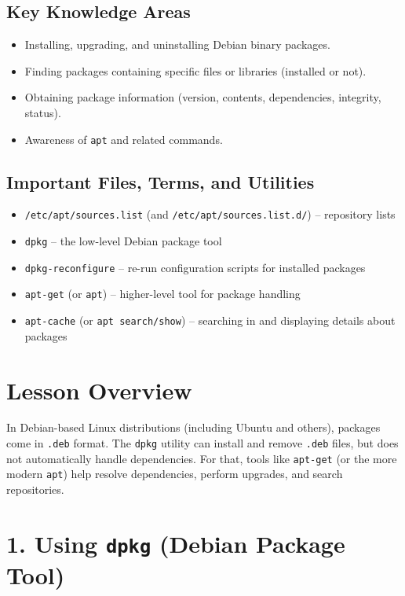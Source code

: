 \documentclass[12pt,a4paper]{report}
\begin{document}
\subsection*{Key Knowledge Areas}
\begin{itemize}
    \item Installing, upgrading, and uninstalling Debian binary packages.
    \item Finding packages containing specific files or libraries (installed or not).
    \item Obtaining package information (version, contents, dependencies, integrity, status).
    \item Awareness of \texttt{apt} and related commands.
\end{itemize}

\subsection*{Important Files, Terms, and Utilities}
\begin{itemize}
    \item \texttt{/etc/apt/sources.list} (and \texttt{/etc/apt/sources.list.d/}) – repository lists
    \item \texttt{dpkg} – the low-level Debian package tool
    \item \texttt{dpkg-reconfigure} – re-run configuration scripts for installed packages
    \item \texttt{apt-get} (or \texttt{apt}) – higher-level tool for package handling
    \item \texttt{apt-cache} (or \texttt{apt search/show}) – searching in and displaying details about packages
\end{itemize}

\section*{Lesson Overview}

In Debian-based Linux distributions (including Ubuntu and others), packages come in \texttt{.deb} format. The \texttt{dpkg} utility can install and remove \texttt{.deb} files, but does not automatically handle dependencies. For that, tools like \texttt{apt-get} (or the more modern \texttt{apt}) help resolve dependencies, perform upgrades, and search repositories.

\section*{1. Using \texttt{dpkg} (Debian Package Tool)}
\end{document}

